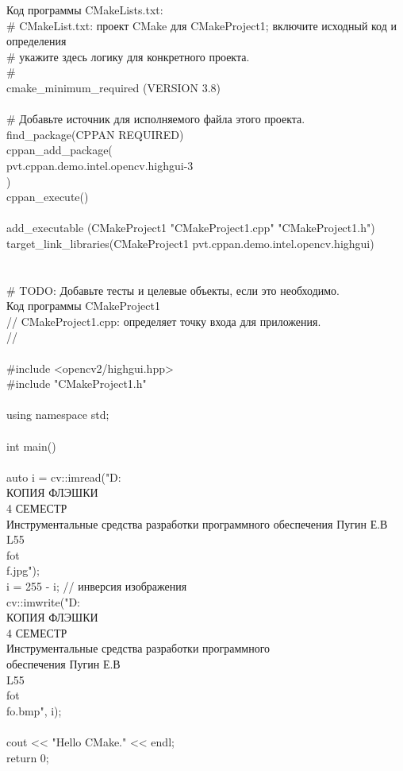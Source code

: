 Код программы CMakeLists.txt:\\

\# CMakeList.txt: проект CMake для CMakeProject1; включите исходный код и определения\\
\# укажите здесь логику для конкретного проекта.\\
\#\\
cmake\_minimum\_required (VERSION 3.8)\\
\\
\# Добавьте источник для исполняемого файла этого проекта.\\
find\_package(CPPAN REQUIRED)\\
cppan\_add\_package(\\
	pvt.cppan.demo.intel.opencv.highgui-3\\
)\\
cppan\_execute()\\
\\
add\_executable (CMakeProject1 "CMakeProject1.cpp" "CMakeProject1.h")\\
target\_link\_libraries(CMakeProject1 pvt.cppan.demo.intel.opencv.highgui)\\
\\
\\
\# TODO: Добавьте тесты и целевые объекты, если это необходимо.\\

Код программы CMakeProject1\\

// CMakeProject1.cpp: определяет точку входа для приложения.\\
//\\
\\
\#include <opencv2/highgui.hpp>\\
\#include "CMakeProject1.h"\\
\\
using namespace std;\\
\\
int main()\\
{\\
	auto i = cv::imread("D:\\КОПИЯ ФЛЭШКИ\\4 СЕМЕСТР\\Инструментальные средства разработки программного  обеспечения Пугин Е.В\\L55\\fot\\f.jpg");\\
	i = 255 - i; // инверсия изображения\\
	cv::imwrite("D:\\КОПИЯ ФЛЭШКИ\\4 СЕМЕСТР\\Инструментальные средства разработки программного\\ обеспечения Пугин Е.В\\L55\\fot\\fo.bmp", i);\\
\\
	cout << "Hello CMake." << endl;\\
	return 0;\\
}\\

